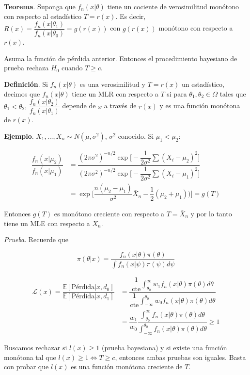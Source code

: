 \documentclass[
  12pt,
]{book}
\begin{document}
\textbf{Teorema}. Suponga que \(f_n(x|\theta)\) tiene un cociente de verosimilitud monótono con respecto al estadístico \(T=r(x)\). Es decir,
\(R(x) = \dfrac{f_n(x|\theta_1)}{f_n(x|\theta_0)} = g(r(x))\)
con \(g(r(x))\) monótono con respecto a \(r(x)\).

Asuma la función de pérdida anterior. Entonces el procedimiento bayesiano de prueba rechaza \(H_0\) cuando \(T\geq c\).

\textbf{Definición}. Si \(f_n(x|\theta)\) es una verosimilitud y \(T=r(x)\) un estadístico, decimos que \(f_n(x|\theta)\) tiene un MLR con respecto a \(T\) si para \(\theta_1,\theta_2 \in \Omega\) tales que \(\theta_1 <\theta_2\), \(\dfrac{f_n(x|\theta_2)}{f_n(x|\theta_1)}\) depende de \(x\) a través de \(r(x)\) y es una función monótona de \(r(x)\).

\textbf{Ejemplo}. \(X_1,\dots, X_n \sim N(\mu,\sigma^2)\), \(\sigma^2\) conocido.
Si \(\mu_1<\mu_2\):

\begin{align*}
\dfrac{f_n(x|\mu_2)}{f_n(x|\mu_1)} & = \dfrac{(2\pi\sigma^2)^{-n/2}\exp\bigg[-\dfrac 1{2\sigma^2}\sum (X_i-\mu_2)^2\bigg]}{(2\pi\sigma^2)^{-n/2}\exp\bigg[-\dfrac 1{2\sigma^2}\sum (X_i-\mu_1)^2\bigg]}\\
& = \exp\bigg[\dfrac{n(\mu_2-\mu_1)}{\sigma^2}\bar X_n -\dfrac 12 (\mu_2+\mu_1))\bigg] = g(T)
\end{align*}

Entonces \(g(T)\) es monótono creciente con respecto a \(T=\bar X_n\) y por lo tanto tiene un MLE con respecto a \(\bar X_n\).

\emph{Prueba}. Recuerde que

\[\pi(\theta|x) = \dfrac{f_n(x|\theta)\pi(\theta)}{\int f_n(x|\psi)\pi(\psi)d\psi}\]

\begin{align*}
\mathcal L(x) = \dfrac{\mathbb E[\text{Pérdida}|x,d_0]}{\mathbb E[\text{Pérdida}|x,d_1]} & = \dfrac{\dfrac 1{\text{cte}} \displaystyle\int_{\theta_0}^\infty w_1f_n(x|\theta)\pi(\theta)d\theta}{\dfrac 1{\text{cte}} \displaystyle\int_{-\infty}^{\theta_0} w_0f_n(x|\theta)\pi(\theta)d\theta} \\ & = \dfrac{w_1}{w_0}\dfrac{ \displaystyle\int_{\theta_0}^\infty f_n(x|\theta)\pi(\theta)d\theta}{ \displaystyle\int_{-\infty}^{\theta_0} f_n(x|\theta)\pi(\theta)d\theta}  \geq 1
\end{align*}

Buscamos rechazar si \(l(x)\geq 1\) (prueba bayesiana) y si existe una función monótona tal que \(l(x)\geq 1 \Leftrightarrow T\geq c\), entonces ambas pruebas son iguales. Basta con probar que \(l(x)\) es una función monótona creciente de \(T\).
\end{document}
